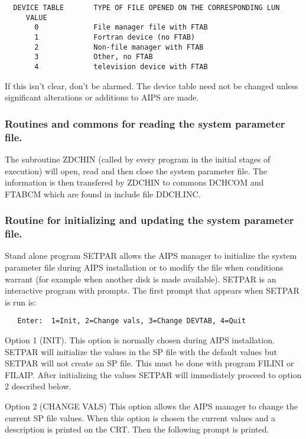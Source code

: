 \begin{verbatim}
  DEVICE TABLE       TYPE OF FILE OPENED ON THE CORRESPONDING LUN
     VALUE
       0             File manager file with FTAB
       1             Fortran device (no FTAB)
       2             Non-file manager with FTAB
       3             Other, no FTAB
       4             television device with FTAB
\end{verbatim}

   If this isn't clear, don't be alarmed.  The device table need not be
changed unless significant alterations or additions to AIPS are made.

\subsubsection{Routines and commons for reading the system parameter file.}

   The subroutine ZDCHIN (called by every program in the
initial stages
of execution) will open, read and then close the system parameter file.
The information is then transfered by ZDCHIN to commons DCHCOM and FTABCM
which are found in include file DDCH.INC.

\subsubsection{Routine for initializing and updating the system parameter file.}

   Stand alone program SETPAR allows the AIPS manager to
initialize the
system parameter file during AIPS installation or to modify the file
when conditions warrant (for example when another disk is made available).
SETPAR is an interactive program with prompts.  The first prompt that
appears when SETPAR is run is:

\begin{verbatim}
   Enter:  1=Init, 2=Change vals, 3=Change DEVTAB, 4=Quit
\end{verbatim}


Option 1 (INIT).
   This option is normally chosen during AIPS installation.  SETPAR will
initialize the values in the SP file with the default values but SETPAR
will not create an SP file.  This must be done with program FILINI or
FILAIP.  After initializing the values SETPAR will immediately proceed
to option 2 described below.

Option 2 (CHANGE VALS)
   This option allows the AIPS manager to change the current SP file
values.  When this option is chosen the current values and a
description is printed on the CRT.  Then the following prompt is printed.

